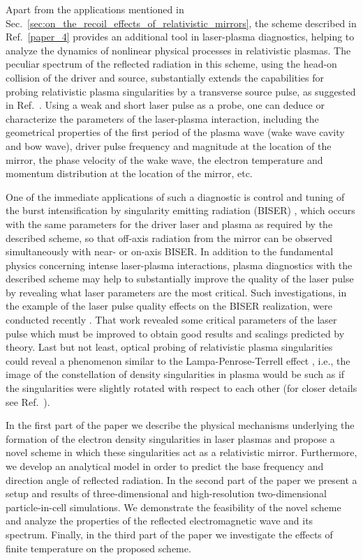 \documentclass[10pt, a4paper, twoside, openright]{report}
\begin{document}
Apart from the applications mentioned in Sec.~\ref{sec:on_the_recoil_effects_of_relativistic_mirrors}, the scheme described in Ref.~\ref{paper_4} provides an additional tool in laser-plasma diagnostics, helping to analyze the dynamics of nonlinear physical processes in relativistic plasmas. The peculiar spectrum of the reflected radiation in this scheme, using the head-on collision of the driver and source, substantially extends the capabilities for probing relativistic plasma singularities by a transverse source pulse, as suggested in Ref.~. Using a weak and short laser pulse as a probe, one can deduce or characterize the parameters of the laser-plasma interaction, including the geometrical properties of the first period of the plasma wave (wake wave cavity and bow wave), driver pulse frequency and magnitude at the location of the mirror, the phase velocity of the wake wave, the electron temperature and momentum distribution at the location of the mirror, etc. 

One of the immediate applications of such a diagnostic is control and tuning of the burst intensification by singularity emitting radiation (BISER) \cite{Pirozhkov2012, Pirozhkov2014, Pirozhkov2017, Sagisaka2020}, which occurs with the same parameters for the driver laser and plasma as required by the described scheme, so that off-axis radiation from the mirror can be observed simultaneously with near- or on-axis BISER. In addition to the fundamental physics concerning intense laser-plasma interactions, plasma diagnostics with the described scheme may help to substantially improve the quality of the laser pulse by revealing what laser parameters are the most critical. Such investigations, in the example of the laser pulse quality effects on the BISER realization, were conducted recently \cite{Pirozhkov2018}. That work revealed some critical parameters of the laser pulse which must be improved to obtain good results and scalings predicted by theory. Last but not least, optical probing of relativistic plasma singularities could reveal a phenomenon similar to the Lampa-Penrose-Terrell effect \cite{Lampa1924, Penrose1959, Terrell1959}, i.e., the image of the constellation of density singularities in plasma would be such as if the singularities were slightly rotated with respect to each other (for closer details see Ref.~).

In the first part of the paper we describe the physical mechanisms underlying the formation of the electron density singularities in laser plasmas and propose a novel scheme in which these singularities act as a relativistic mirror. Furthermore, we develop an analytical model in order to predict the base frequency and direction angle of reflected radiation. In the second part of the paper we present a setup and results of three-dimensional and high-resolution two-dimensional particle-in-cell simulations. We demonstrate the feasibility of the novel scheme and analyze the properties of the reflected electromagnetic wave and its spectrum. Finally, in the third part of the paper we investigate the effects of finite temperature on the proposed scheme.
\end{document}
